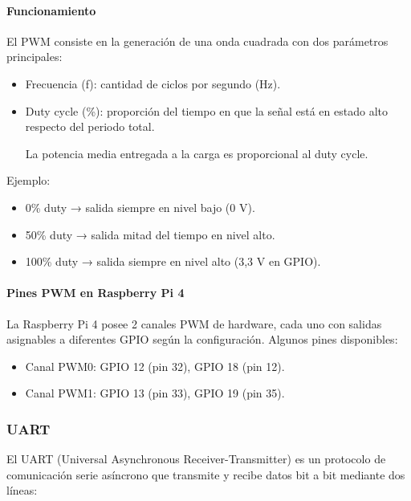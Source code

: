 \documentclass[12pt,a4paper]{article}
\begin{document}
\paragraph{Funcionamiento}
El PWM consiste en la generación de una onda cuadrada con dos parámetros principales:

\begin{itemize}
\item Frecuencia (f): cantidad de ciclos por segundo (Hz).

\item Duty cycle (\%): proporción del tiempo en que la señal está en estado alto respecto del periodo total.

La potencia media entregada a la carga es proporcional al duty cycle.
\end{itemize}

Ejemplo:

\begin{itemize}
\item 0\% duty → salida siempre en nivel bajo (0 V).

\item 50\% duty → salida mitad del tiempo en nivel alto.

\item 100\% duty → salida siempre en nivel alto (3,3 V en GPIO).
\end{itemize}

\paragraph{Pines PWM en Raspberry Pi 4}

La Raspberry Pi 4 posee 2 canales PWM de hardware, cada uno con salidas asignables a diferentes GPIO según la configuración.
Algunos pines disponibles:

\begin{itemize}

\item Canal PWM0: GPIO 12 (pin 32), GPIO 18 (pin 12).

\item Canal PWM1: GPIO 13 (pin 33), GPIO 19 (pin 35).

\end{itemize}

\subsubsection{UART}

El UART (Universal Asynchronous Receiver-Transmitter) es un protocolo de comunicación serie asíncrono que transmite y recibe datos bit a bit mediante dos líneas:
\end{document}
